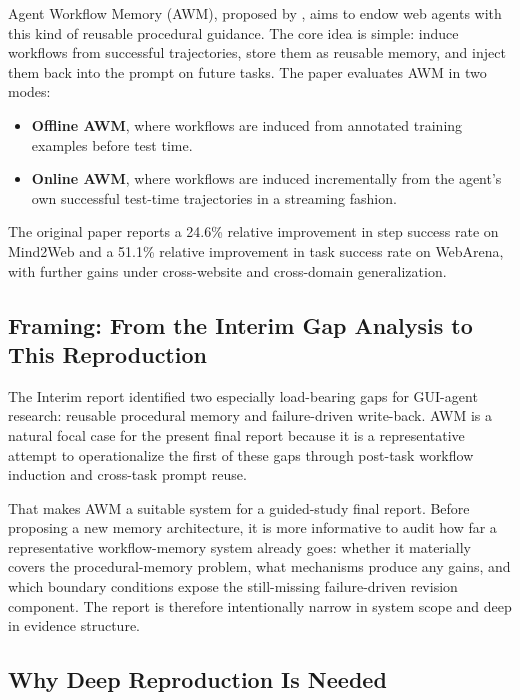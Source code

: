 \documentclass{article}
\providecommand{\tightlist}{%
  \setlength{\itemsep}{0pt}\setlength{\parskip}{0.8em}}
\begin{document}
Agent Workflow Memory (AWM), proposed by \textcite{wang2024agent}, aims to
endow web agents with this kind of reusable procedural guidance. The
core idea is simple: induce workflows from successful trajectories,
store them as reusable memory, and inject them back into the prompt on
future tasks. The paper evaluates AWM in two modes:

\begin{itemize}
\tightlist
\item
  \textbf{Offline AWM}, where workflows are induced from annotated
  training examples before test time.
\item
  \textbf{Online AWM}, where workflows are induced incrementally from
  the agent's own successful test-time trajectories in a streaming
  fashion.
\end{itemize}

The original paper reports a 24.6\% relative improvement in step success
rate on Mind2Web and a 51.1\% relative improvement in task success rate
on WebArena, with further gains under cross-website and cross-domain
generalization.

\subsection{Framing: From the Interim Gap Analysis to This
Reproduction}\label{framing-from-the-interim-gap-analysis-to-this-reproduction}

The Interim report identified two especially load-bearing gaps for
GUI-agent research: reusable procedural memory and failure-driven
write-back. AWM is a natural focal case for the present final report
because it is a representative attempt to operationalize the first of
these gaps through post-task workflow induction and cross-task prompt
reuse.

That makes AWM a suitable system for a guided-study final report.
Before proposing a new memory architecture, it is more informative to
audit how far a representative workflow-memory system already goes:
whether it materially covers the procedural-memory problem, what
mechanisms produce any gains, and which boundary conditions expose the
still-missing failure-driven revision component. The report is therefore
intentionally narrow in system scope and deep in evidence structure.

\subsection{Why Deep Reproduction Is
Needed}\label{why-deep-reproduction-is-needed}
\end{document}
